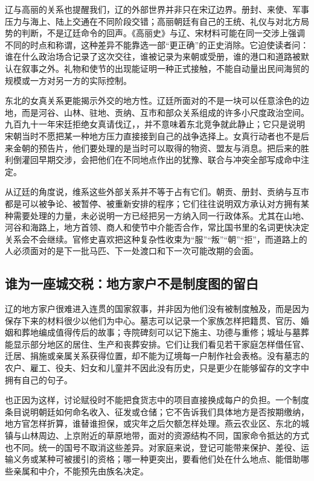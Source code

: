 辽与高丽的关系也提醒我们，辽的外部世界并非只在宋辽边界。册封、来使、军事压力与海上、陆上交通在不同阶段交错；高丽朝廷有自己的王统、礼仪与对北方局势的判断，不是辽廷命令的回声。《高丽史》与辽、宋材料可能在同一交涉上强调不同的时点和称谓，这种差异不能靠选一部“更正确”的正史消除。它迫使读者问：谁在什么政治场合记录了这次交往，谁被记录为来朝或受册，谁的港口和道路被默认在叙事之外。礼物和使节的出现能证明一种正式接触，不能自动量出民间海贸的规模或一方对另一方的实际控制。

东北的女真关系更能揭示外交的地方性。辽廷所面对的不是一块可以任意涂色的边地，而是河谷、山林、驻地、贡纳、互市和部众关系组成的许多小尺度政治空间。九百九十一年宋廷拒绝女真请伐辽，，并不意味着东北竞争就此静止；它只是说明宋朝当时不愿把某一种地方压力直接接到自己的战争选择上。女真行动者也不是后来金朝的预告片，他们要处理的是当时可以取得的物资、盟友与消息。把后来的胜利倒灌回早期交涉，会把他们在不同地点作出的犹豫、联合与冲突全部写成命中注定。

从辽廷的角度说，维系这些外部关系并不等于占有它们。朝贡、册封、贡纳与互市都是可以被争论、被暂停、被重新安排的程序；它们往往说明双方承认对方拥有某种需要处理的力量，未必说明一方已经把另一方纳入同一行政体系。尤其在山地、河谷和海路上，地方首领、商人和使节中介能否合作，常比国书里的名词更快决定关系会不会继续。官修史喜欢把这种复杂性收束为“服”“叛”“朝”“拒”，而道路上的人必须面对的是下一批马匹、下一处渡口和下一次可能改期的会面。

\subsection{谁为一座城交税：地方家户不是制度图的留白}

辽的地方家户很难进入连贯的国家叙事，并非因为他们没有被制度触及，而是因为保存下来的材料很少以他们为中心。墓志可以记录一个家族怎样把籍贯、官历、婚姻和葬地编成值得传后的故事；寺院碑刻可以记下施主、功德与重修；城址与墓葬能显示部分地区的居住、生产和丧葬安排。它们让我们看见若干家庭怎样借任官、迁居、捐施或亲属关系获得位置，却不能为辽境每一户制作社会表格。没有墓志的农户、雇工、役夫、妇女和儿童并不因此没有历史，只是更少在能够留存的文字中拥有自己的句子。

也正因为这样，讨论赋役时不能把食货志中的项目直接换成每户的负担。一个制度条目说明朝廷如何命名收入、征发或仓储；它不告诉我们具体地方是否按期缴纳，地方官怎样折算，谁替谁担保，或灾年之后欠额怎样处理。燕云农业区、东北的城镇与山林周边、上京附近的草原地带，面对的资源结构不同，国家命令抵达的方式也不同。统一的国号不取消这些差异。对家庭来说，登记可能带来保护、差役、运输义务或某种可被援引的资格；哪一种更突出，要看他们处在什么地点、能借助哪些亲属和中介，不能预先由族名决定。

